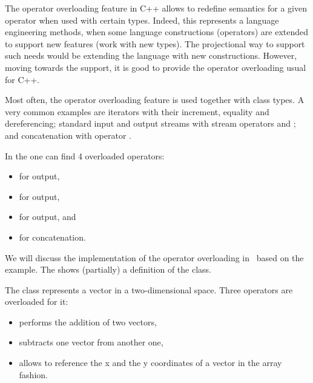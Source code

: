 

\cppproblem

The operator overloading feature in C++ allows to redefine semantics for a given operator when used 
with certain types. Indeed, this represents a language engineering methods, when some language constructions
(operators) are extended to support new features (work with new types). The projectional way to support such
needs would be extending the language with new constructions. However, moving towards the  support, 
it is good to provide the operator overloading usual for C++.

Most often, the operator overloading feature is used together with class types. A very common examples are iterators with 
their increment, equality and dereferencing; standard input and output streams with stream operators \cc{<<} and \cc{>>}; and 
concatenation with operator \cc{+}.


In the  one can find 4 overloaded operators: 
\begin{itemize}
 \item for  output,
 \item for  output,
 \item for  output, and 
 \item for  concatenation.
\end{itemize}



\pcppsolution


We will discuss the implementation of the operator overloading in \pcpp\ based on the 
example. The  shows (partially) a definition of the  class.


The class represents a vector in a two-dimensional space. Three operators are overloaded for it:
\begin{itemize}
 \item {} performs the addition of two vectors,
 \item {} subtracts one vector from another one,
 \item {} allows to reference the x and the y coordinates of a vector in the array fashion.
\end{itemize}



